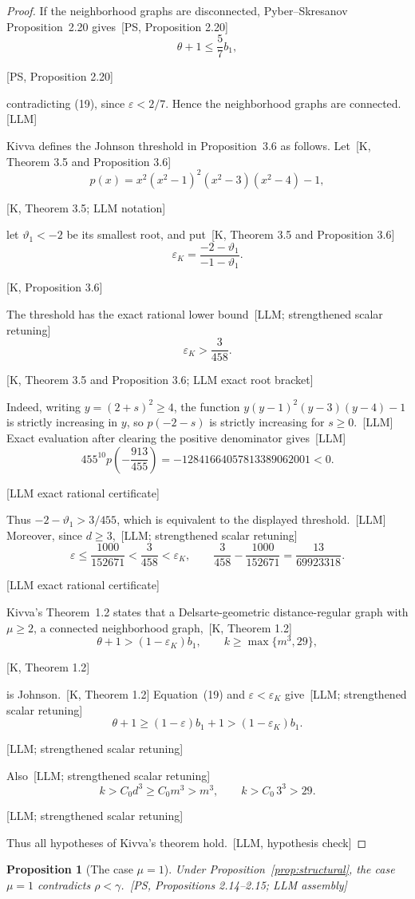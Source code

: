 \documentclass[10pt]{amsart}
\newtheorem{proposition}[theorem]{Proposition}
\theoremstyle{remark}
\newcommand{\eps}{\varepsilon}
\newcommand{\prov}[1]{\unskip\, {\normalfont\scriptsize\color{provgray}\textsf{[#1]}}}
\newcommand{\eqprov}[1]{%
  \par\nobreak\vspace{-0.68\baselineskip}%
  \noindent\hfill{\normalfont\scriptsize\color{provgray}\textsf{[#1]}}%
  \par\vspace{0.20\baselineskip}%
}
\begin{document}
\begin{proof}
If the neighborhood graphs are disconnected, Pyber--Skresanov Proposition~2.20 gives\prov{PS, Proposition 2.20}
\[
\theta+1\le\frac57b_1,
\]
\eqprov{PS, Proposition 2.20}
contradicting (19), since $\eps<2/7$. Hence the neighborhood graphs are connected.\prov{LLM}

Kivva defines the Johnson threshold in Proposition~3.6 as follows. Let\prov{K, Theorem 3.5 and Proposition 3.6}
\[
p(x)=x^2(x^2-1)^2(x^2-3)(x^2-4)-1,
\]
\eqprov{K, Theorem 3.5; LLM notation}
let $\vartheta_1<-2$ be its smallest root, and put\prov{K, Theorem 3.5 and Proposition 3.6}
\[
\eps_K=\frac{-2-\vartheta_1}{-1-\vartheta_1}.
\]
\eqprov{K, Proposition 3.6}
The threshold has the exact rational lower bound\prov{LLM; strengthened scalar retuning}
\[
\eps_K>\frac3{458}.
\]
\eqprov{K, Theorem 3.5 and Proposition 3.6; LLM exact root bracket}
Indeed, writing $y=(2+s)^2\ge4$, the function $y(y-1)^2(y-3)(y-4)-1$ is strictly increasing in $y$, so $p(-2-s)$ is strictly increasing for $s\ge0$.\prov{LLM} Exact evaluation after clearing the positive denominator gives\prov{LLM}
\[
455^{10}p\!\left(-\frac{913}{455}\right)
=-12841664057813389062001<0.
\]
\eqprov{LLM exact rational certificate}
Thus $-2-\vartheta_1>3/455$, which is equivalent to the displayed threshold.\prov{LLM}
Moreover, since $d\ge3$,\prov{LLM; strengthened scalar retuning}
\[
\eps\le\frac{1000}{152671}<\frac3{458}<\eps_K,
\qquad
\frac3{458}-\frac{1000}{152671}=\frac{13}{69923318}.
\]
\eqprov{LLM exact rational certificate}
Kivva's Theorem~1.2 states that a Delsarte-geometric distance-regular graph with $\mu\ge2$, a connected neighborhood graph,\prov{K, Theorem 1.2}
\[
\theta+1>(1-\eps_K)b_1,
\qquad k\ge\max\{m^3,29\},
\]
\eqprov{K, Theorem 1.2}
is Johnson.\prov{K, Theorem 1.2} Equation~(19) and $\eps<\eps_K$ give\prov{LLM; strengthened scalar retuning}
\[
\theta+1\ge(1-\eps)b_1+1>(1-\eps_K)b_1.
\]
\eqprov{LLM; strengthened scalar retuning}
Also\prov{LLM; strengthened scalar retuning}
\[
k>C_0d^3\ge C_0m^3>m^3,
\qquad
k>C_0\,3^3>29.
\]
\eqprov{LLM; strengthened scalar retuning}
Thus all hypotheses of Kivva's theorem hold.\prov{LLM, hypothesis check}
\end{proof}

\begin{proposition}[The case $\mu=1$]\label{prop:mu-one}
Under Proposition~\ref{prop:structural}, the case $\mu=1$ contradicts $\rho<\gamma$.\prov{PS, Propositions 2.14--2.15; LLM assembly}
\end{proposition}
\end{document}
